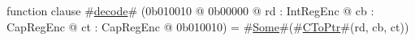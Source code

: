 function clause #\hyperref[sailMIPSzdecode]{decode}# (0b010010 @ 0b00000 @ rd : IntRegEnc @ cb : CapRegEnc @ ct : CapRegEnc @ 0b010010) = #\hyperref[sailMIPSzSome]{Some}#(#\hyperref[sailMIPSzCToPtr]{CToPtr}#(rd, cb, ct))

